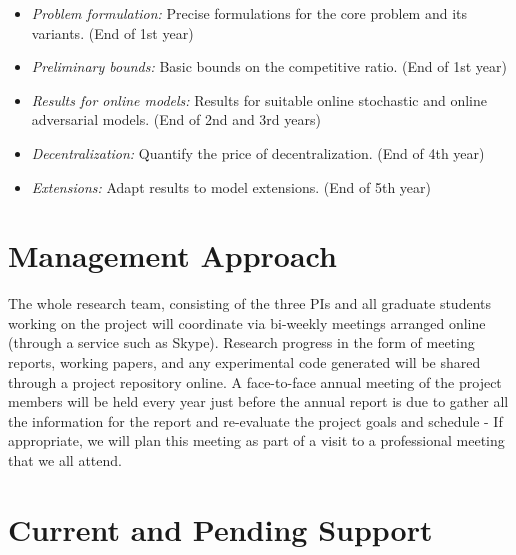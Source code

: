 \begin{itemize}
\item
{\sl Problem formulation:} Precise formulations for the core problem
and its variants.  (End of 1st year)
\item
{\sl Preliminary bounds:} Basic bounds on the competitive ratio. (End of 1st year)
\item
{\sl Results for online models:} Results for suitable online stochastic and
online adversarial models. (End of 2nd and 3rd years)
\item
{\sl Decentralization:} Quantify the price of decentralization. (End of 4th year)
\item
{\sl Extensions:} Adapt results to model extensions. (End of 5th year)
\end{itemize}

\section{Management Approach}

The whole research team, consisting of the three PIs and all graduate students working on the project will coordinate via bi-weekly meetings arranged online (through a service such as Skype). Research progress in the form of meeting reports, working papers, and any experimental code generated will be shared through a project repository online. A face-to-face annual meeting of the project members will be held every year just before the annual report is due to gather all the information for the report and re-evaluate the project goals and schedule - If appropriate, we will plan this meeting as part of a visit to a professional meeting that we all attend.


\section{Current and Pending Support}

